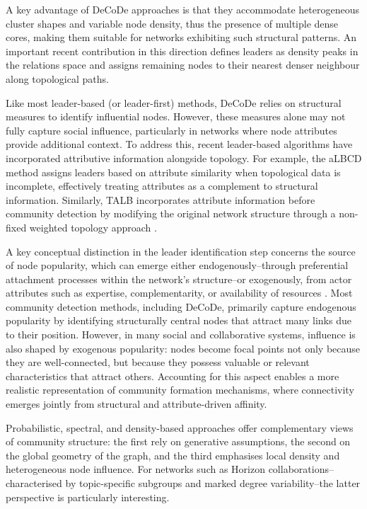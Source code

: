\documentclass[11pt]{article}
\begin{document}
A key advantage of DeCoDe approaches is that they accommodate heterogeneous cluster shapes and variable node density, thus the presence of multiple dense cores, making them suitable for networks exhibiting such structural patterns. 
An important recent contribution in this direction \citep{Menardi2022Density-basedNetworks} defines leaders as density peaks in the relations space and assigns remaining nodes to their nearest denser neighbour along topological paths. 

Like most leader-based (or leader-first) methods, DeCoDe relies on structural measures to identify influential nodes. However, these measures alone may not fully capture social influence, particularly in networks where node attributes provide additional context. 
To address this, recent leader-based algorithms have incorporated attributive information alongside topology. For example, the aLBCD method \citep{Helal2016AnNetworks} assigns leaders based on attribute similarity when topological data is incomplete, effectively treating attributes as a complement to structural information. Similarly, TALB \citep{Lu2021Leader-BasedNetworks} incorporates attribute information before community detection by modifying the original network structure through a non-fixed weighted topology approach \citep{Chunaev2020CommunitySurvey}.

A key conceptual distinction in the leader identification step concerns the source of node popularity, which can emerge either endogenously--through preferential attachment processes within the network’s structure--or exogenously, from actor attributes such as expertise, complementarity, or availability of resources \citep{Barabsi1999, Bianconi2001, Papadopoulos2012}. Most community detection methods, including DeCoDe, primarily capture endogenous popularity by identifying structurally central nodes that attract many links due to their position. However, in many social and collaborative systems, influence is also shaped by exogenous popularity: nodes become focal points not only because they are well-connected, but because they possess valuable or relevant characteristics that attract others. Accounting for this aspect enables a more realistic representation of community formation mechanisms, where connectivity emerges jointly from structural and attribute-driven affinity.

Probabilistic, spectral, and density-based approaches offer complementary views of community structure: the first rely on generative assumptions, the second on the global geometry of the graph, and the third emphasises local density and heterogeneous node influence. For networks such as Horizon collaborations--characterised by topic-specific subgroups and marked degree variability--the latter perspective is particularly interesting. 
\end{document}
